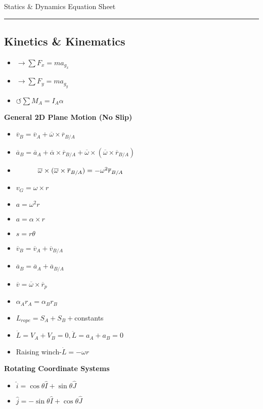 \documentclass [10pt] {article}
\begin{document}
Statics \& Dynamics Equation Sheet\\
\rule{7.6in}{0.4pt}
\begin{multicols*}{2}
\section{Kinetics \& Kinematics}
		\begin{itemize}
			\item $\rightarrow \sum F_x = ma_{g_x}$
			\item $\rightarrow \sum F_y = ma_{g_y}$
			\item $\circlearrowleft \sum M_A = I_A\alpha$\\
		\end{itemize}
	\textbf{General 2D Plane Motion (No Slip)}
		\begin{itemize}
			\item $\overline{v}_B = \overline{v}_A + \overline{\omega} \times \overline{r}_{B/A} $
			\item $\overline{a}_B = \overline{a}_A + \overline{\alpha} \times \overline{r}_{B/A} + \overline{\omega} \times (\overline{\omega} \times \overline{r}_{B/A})$
			\item $\indent \indent \overline{\omega} \times (\overline{\omega} \times \overline{r}_{B/A}) = -\omega^2\overline{r}_{B/A}$
			\item $v_G = \omega \times r$
			\item $a = \omega^2 r$ 
			\item $a = \alpha \times r$
			\item $s = r\theta$
			\item $\overline{v}_{B} = \overline{v}_A + \overline{v}_{B/A}$
			\item $\overline{a}_{B} = \overline{a}_A + \overline{a}_{B/A}$
			\item $\overline{v} = \overline{\omega} \times \overline{r}_p$
			\item $\alpha_Ar_A = \alpha_Br_B$
			\item $L_{rope} = S_A + S_B + $constants
			\item $\dot{L} = V_A + V_B = 0, \ddot{L} = a_A + a_B = 0$ 
			\item Raising winch-$ \dot{L} = -\omega r$ \\
		\end{itemize}
\textbf{Rotating Coordinate Systems}
		\begin{itemize}
			\item $\hat{i} = \cos\theta\hat{I} + \sin\theta\hat{J}$
			\item $\hat{j} = -\sin\theta\hat{I} + \cos\theta\hat{J}$

\end{itemize}
\end{multicols*}
\end{document}
